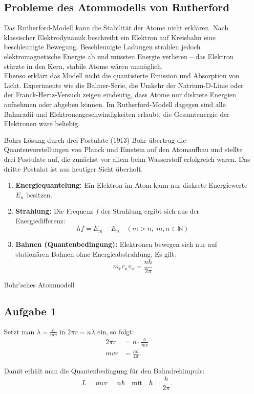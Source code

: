 \documentclass[11pt,a4paper,oneside]{article}
\begin{document}
	\newpage
	
	
	\subsection{Probleme des Atommodells von Rutherford}
	
	Das Rutherford-Modell kann die Stabilität der Atome nicht erklären. 
	Nach klassischer Elektrodynamik beschreibt ein Elektron auf Kreisbahn 
	eine beschleunigte Bewegung. Beschleunigte Ladungen strahlen jedoch 
	elektromagnetische Energie ab und müssten Energie verlieren – 
	das Elektron stürzte in den Kern, stabile Atome wären unmöglich. \\
	
	Ebenso erklärt das Modell nicht die quantisierte Emission und Absorption 
	von Licht. Experimente wie die Balmer-Serie, die Umkehr der Natrium-D-Linie 
	oder der Franck-Hertz-Versuch zeigen eindeutig, dass Atome nur diskrete 
	Energien aufnehmen oder abgeben können. Im Rutherford-Modell dagegen 
	sind alle Bahnradii und Elektronengeschwindigkeiten erlaubt, 
	die Gesamtenergie der Elektronen wäre beliebig.
	
	\begin{theo}{Bohrs Lösung durch drei Postulate (1913)}
		Bohr übertrug die Quantenvorstellungen von Planck und Einstein 
		auf den Atomaufbau und stellte drei Postulate auf, 
		die zunächst vor allem beim Wasserstoff erfolgreich waren. 
		Das dritte Postulat ist aus heutiger Sicht überholt.
		
		\begin{enumerate}
			\item \textbf{Energiequantelung:} 
			Ein Elektron im Atom kann nur diskrete Energiewerte $E_n$ besitzen.
			
			\item \textbf{Strahlung:} 
			Die Frequenz $f$ der Strahlung ergibt sich aus der Energiedifferenz:
			\[
			h f = E_m - E_n \quad (m > n, \; m,n \in \mathbb{N})
			\]
			
			\item \textbf{Bahnen (Quantenbedingung):} 
			Elektronen bewegen sich nur auf stationären Bahnen ohne Energieabstrahlung. 
			Es gilt:
			\[
			m_e r_n v_n = \frac{n h}{2 \pi}
			\]
		\end{enumerate}
	\end{theo}
	
	\begin{loesung}{Bohr'sches Atommodell}
		\subsection*{Aufgabe 1}		
		Setzt man $\lambda = \tfrac{h}{mv}$ in $2 \pi r = n \lambda$ ein, so folgt:
		\begin{align*}
			2 \pi r &= n \cdot \frac{h}{m v} \\
			m v r &= \frac{n h}{2 \pi}.
		\end{align*}
		
		Damit erhält man die Quantenbedingung für den Bahndrehimpuls:
		\[
		L = m v r = n \hbar \quad \text{mit} \quad \hbar = \frac{h}{2 \pi}.
		\]
	\end{loesung}
	
\end{document}
